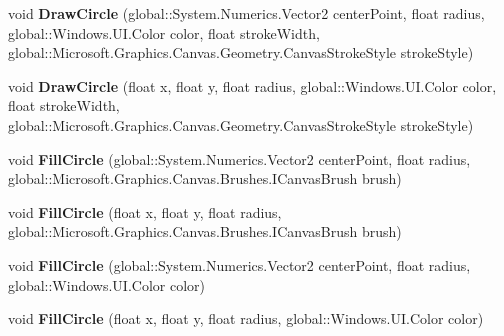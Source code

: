 \begin{DoxyCompactItemize}
void {\bfseries Draw\+Circle} (global\+::\+System.\+Numerics.\+Vector2 center\+Point, float radius, global\+::\+Windows.\+U\+I.\+Color color, float stroke\+Width, global\+::\+Microsoft.\+Graphics.\+Canvas.\+Geometry.\+Canvas\+Stroke\+Style stroke\+Style)
\item 
\mbox{\label{interface_microsoft_1_1_graphics_1_1_canvas_1_1_i_canvas_drawing_session_a2009ac7efb7be9924ed54c9810645953}} 
void {\bfseries Draw\+Circle} (float x, float y, float radius, global\+::\+Windows.\+U\+I.\+Color color, float stroke\+Width, global\+::\+Microsoft.\+Graphics.\+Canvas.\+Geometry.\+Canvas\+Stroke\+Style stroke\+Style)
\item 
\mbox{\label{interface_microsoft_1_1_graphics_1_1_canvas_1_1_i_canvas_drawing_session_a945e112a3b7fe91ca27d84a4946ee787}} 
void {\bfseries Fill\+Circle} (global\+::\+System.\+Numerics.\+Vector2 center\+Point, float radius, global\+::\+Microsoft.\+Graphics.\+Canvas.\+Brushes.\+I\+Canvas\+Brush brush)
\item 
\mbox{\label{interface_microsoft_1_1_graphics_1_1_canvas_1_1_i_canvas_drawing_session_ac346111dbd98eeef6ee9ac4d32eef64c}} 
void {\bfseries Fill\+Circle} (float x, float y, float radius, global\+::\+Microsoft.\+Graphics.\+Canvas.\+Brushes.\+I\+Canvas\+Brush brush)
\item 
\mbox{\label{interface_microsoft_1_1_graphics_1_1_canvas_1_1_i_canvas_drawing_session_a113eced7782f4fbe113740f5b4b39306}} 
void {\bfseries Fill\+Circle} (global\+::\+System.\+Numerics.\+Vector2 center\+Point, float radius, global\+::\+Windows.\+U\+I.\+Color color)
\item 
\mbox{\label{interface_microsoft_1_1_graphics_1_1_canvas_1_1_i_canvas_drawing_session_ac12f83ab62d12b274bb444c922a7db92}} 
void {\bfseries Fill\+Circle} (float x, float y, float radius, global\+::\+Windows.\+U\+I.\+Color color)
\item 
\mbox{\label{interface_microsoft_1_1_graphics_1_1_canvas_1_1_i_canvas_drawing_session_a5336f3ca33a362dc00c6305bfb69f5af}} 

\end{DoxyCompactItemize}
